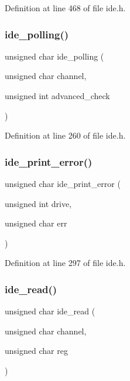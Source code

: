 Definition at line 468 of file ide.\+h.

\mbox{\label{a00005_a03e85b94d6fbfb957e1b88c3dd064eca_a03e85b94d6fbfb957e1b88c3dd064eca}} 
\subsubsection{\texorpdfstring{ide\+\_\+polling()}{ide\_polling()}}
{\footnotesize\ttfamily unsigned char ide\+\_\+polling (\begin{DoxyParamCaption}\item[{unsigned char}]{channel,  }\item[{unsigned int}]{advanced\+\_\+check }\end{DoxyParamCaption})}



Definition at line 260 of file ide.\+h.

\mbox{\label{a00005_af7757307613c29c9bcbf0f8f5b2feee5_af7757307613c29c9bcbf0f8f5b2feee5}} 
\subsubsection{\texorpdfstring{ide\+\_\+print\+\_\+error()}{ide\_print\_error()}}
{\footnotesize\ttfamily unsigned char ide\+\_\+print\+\_\+error (\begin{DoxyParamCaption}\item[{unsigned int}]{drive,  }\item[{unsigned char}]{err }\end{DoxyParamCaption})}



Definition at line 297 of file ide.\+h.

\mbox{\label{a00005_aef734da4bdc0c1d014528fd2f66e0686_aef734da4bdc0c1d014528fd2f66e0686}} 
\subsubsection{\texorpdfstring{ide\+\_\+read()}{ide\_read()}}
{\footnotesize\ttfamily unsigned char ide\+\_\+read (\begin{DoxyParamCaption}\item[{unsigned char}]{channel,  }\item[{unsigned char}]{reg }\end{DoxyParamCaption})}



